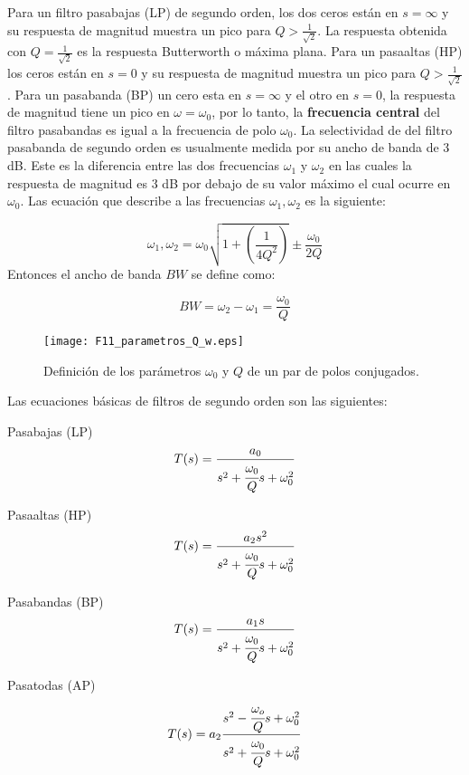 	Para un filtro pasabajas (LP) de segundo orden, los dos ceros están en $s = \infty$ y su respuesta de magnitud muestra un pico para $Q > \frac{1}{\sqrt{2}}$. La respuesta obtenida con $Q = \frac{1}{\sqrt{2}}$ es la respuesta Butterworth o máxima plana. Para un pasaaltas (HP) los ceros están en $s = 0$ y su respuesta de magnitud muestra un pico para $Q > \frac{1}{\sqrt{2}}$. Para un pasabanda (BP) un cero esta en $s = \infty$ y el otro en $s = 0$, la respuesta de magnitud tiene un pico en $\omega = \omega_{0}$, por lo tanto, la \textbf{frecuencia central} del filtro pasabandas es igual a la frecuencia de polo $\omega_{0}$. La selectividad de del filtro pasabanda de segundo orden es usualmente medida por su ancho de banda de 3 dB. Este es la diferencia entre las dos frecuencias $\omega_{1}$ y $\omega_{2}$ en las cuales la respuesta de magnitud es 3 dB por debajo de su valor máximo el cual ocurre en $\omega_{0}$. Las ecuación que describe a las frecuencias $\omega_{1},\omega_{2}$ es la siguiente:
	
	\begin{equation}
		\omega_{1},\omega_{2} = \omega_{0} \sqrt{1 + \left( \frac{1}{4 Q^{2}} \right)}  \pm \frac{\omega_{0}}{2 Q}
	\end{equation}
	Entonces el ancho de banda $BW$ se define como:
	
	\begin{equation}
	BW = \omega_{2} - \omega_{1} = \frac{\omega_{0}}{Q}
	\end{equation}
	\begin{figure}[hbtp]
	\caption{Definición de los parámetros $\omega_{0}$ y $Q$ de un par de polos conjugados.} 
	\label{fig:F11_parametros_Q_w}
	\centering
	\texttt{[image: F11\_parametros\_Q\_w.eps]}
	\end{figure}
	
	Las ecuaciones básicas de filtros de segundo orden son las siguientes:
	
	Pasabajas (LP)
	\begin{equation}
	T(s) = \frac{a_{0}}{s^{2} + \cfrac{\omega_{0}}{Q} s + \omega_{0}^{2}}
	\end{equation}
	
	Pasaaltas (HP)
	\begin{equation}
	T(s) = \frac{a_{2} s^{2}}{s^{2} + \cfrac{\omega_{0}}{Q} s + \omega_{0}^{2}}
	\end{equation}
	
	Pasabandas (BP)
	\begin{equation}
	T(s) = \frac{a_{1} s}{s^{2} + \cfrac{\omega_{0}}{Q} s + \omega_{0}^{2}}
	\end{equation}
	
	Pasatodas (AP)
	\begin{equation}
	T(s) = a_{2} \frac{s^{2} - \cfrac{\omega_{o}}{Q}s + \omega_{0}^{2} }{s^{2} + \cfrac{\omega_{0}}{Q} s + \omega_{0}^{2}}
	\end{equation}
	